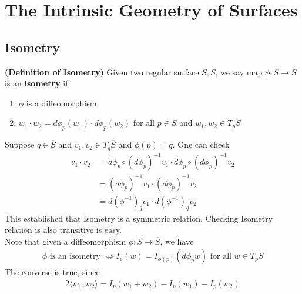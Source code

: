 \documentclass{report}
\begin{document}
\chapter{The Intrinsic Geometry of Surfaces}
\section{Isometry}
\begin{definition}
\textbf{(Definition of Isometry)} Given two regular surface $S,\overline{S}$, we say map $\phi:S\rightarrow \overline{S}$ is an \textbf{isometry} if 
\begin{enumerate}[label=(\alph*)]
  \item $\phi$ is a diffeomorphism 
  \item $w_1\cdot w_2= d\phi_p (w_1)\cdot d\phi_p (w_2) $ for all $p \in S$ and $w_1,w_2 \in T_pS$
\end{enumerate}
\end{definition}
\begin{mdframed}
Suppose $q \in \overline{S}$ and $v_1,v_2 \in T_q \overline{S}$ and $\phi (p)=q$. One can check 
\begin{align*}
v_1\cdot v_2 &=  d\phi_p \circ (d\phi_p)^{-1} v_1\cdot d\phi_p \circ (d\phi_p)^{-1} v_2\\
&=(d\phi_p)^{-1}v_1 \cdot (d\phi_p)^{-1}v_2\\
&=d(\phi^{-1})_qv_1 \cdot d(\phi^{-1})_q v_2
\end{align*}
This established that Isometry is a symmetric relation. Checking Isometry relation is also transitive is easy.\\

Note that given a diffeomorphism $\phi:S\rightarrow \overline{S}$, we have 
\begin{align*}
\phi\text{ is an isometry }\iff I_p(w)=I_{\phi (p)}(d\phi_p w)\text{ for all }w \in T_pS
\end{align*}
The converse is true, since 
\begin{align*}
2\langle w_1,w_2\rangle = I_p(w_1+w_2)-I_p(w_1)-I_p(w_2)
\end{align*}
\end{mdframed}
\end{document}
